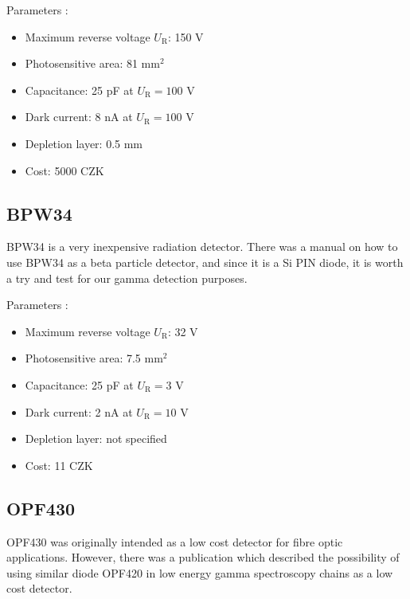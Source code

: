 Parameters \cite{datS14605}:
\begin{itemize}
\item Maximum reverse voltage $U_\textrm{R}$: 150 V
\item Photosensitive area: 81 mm$^2$
\item Capacitance: 25 pF at $U_\textrm{R} = 100$ V
\item Dark current: 8 nA at $U_\textrm{R} = 100$ V
\item Depletion layer: 0.5 mm
\item Cost: 5000 CZK
\end{itemize}

% 



\subsection{BPW34}
BPW34 is a very inexpensive radiation detector. There was a manual \cite{betaBPW} on how to use BPW34 as a beta particle detector, and since it is a Si PIN diode, it is worth a try and test for our gamma detection purposes.



Parameters \cite{datBPW34}:
\begin{itemize}
\item Maximum reverse voltage $U_\textrm{R}$: 32 V
\item Photosensitive area: 7.5 mm$^2$
\item Capacitance: 25 pF at $U_\textrm{R} = 3$ V
\item Dark current: 2 nA at $U_\textrm{R} = 10$ V
\item Depletion layer: not specified
\item Cost: 11 CZK
\end{itemize}

% 
\subsection{OPF430}
OPF430 was originally intended as a low cost detector for fibre optic applications. However, there was a publication \cite{RAMIREZJIMENEZ2003577} which described the possibility of using similar diode OPF420 in low energy gamma spectroscopy chains as a low cost detector.

